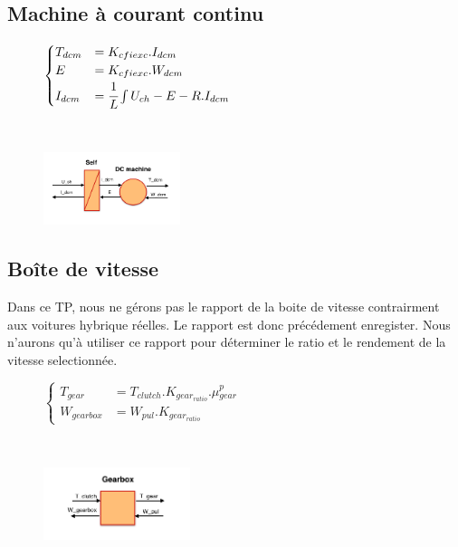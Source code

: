 \subsection{Machine à courant continu}
\vspace{-10px}
\begin{figure}[ht]
\centering
\begin{minipage}{.5\textwidth}  
\centering
$\begin{cases}
	 T_{dcm} &= K_{cfiexc}.I_{dcm}\\
	E &= K_{cfiexc}.W_{dcm}\\
	I_{dcm} &= \cfrac{1}{L}\int{U_{ch}-E-R.I_{dcm}}	
\end{cases}$
\end{minipage}~
\begin{minipage}{.5\textwidth}
  \centering
\includegraphics[height=80px]{images/MCC.png}
\end{minipage}
\end{figure}
\FloatBarrier
\vspace{-20px}

\subsection{Boîte de vitesse}
Dans ce TP, nous ne gérons pas le rapport de la boite de vitesse contrairment aux voitures hybrique réelles. Le rapport est donc précédement enregister. Nous n'aurons qu'à utiliser ce rapport pour déterminer le ratio et le rendement de la vitesse selectionnée. 
\vspace{-10px}
\begin{figure}[ht]
\centering
\begin{minipage}{.5\textwidth}  
\centering
$\begin{cases}
	 T_{gear} &= T_{clutch}.K_{gear_{ratio}}.\mu{}_{gear}^{p} \\
	W_{gearbox} &= W_{pul}.K_{gear_{ratio}}
\end{cases}$
\end{minipage}~
\begin{minipage}{.5\textwidth}
  \centering
\includegraphics[height=80px]{images/Gearbox.png}
\end{minipage}
\end{figure}
\FloatBarrier
\vspace{-20px}

